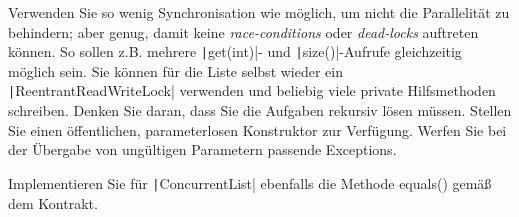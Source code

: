 \documentclass[11pt]{article} %
\newcommand{\code}[1]{\texttt|#1|}
\begin{document}
Verwenden Sie so wenig Synchronisation wie möglich, um nicht die Parallelität zu behindern; aber genug, damit keine \emph{race-conditions} oder \emph{dead-locks} auftreten können. So sollen z.B. mehrere \code{get(int)}- und \code{size()}-Aufrufe gleichzeitig möglich sein. Sie können für die Liste selbst wieder ein \code{ReentrantReadWriteLock} verwenden und beliebig viele private Hilfsmethoden schreiben. Denken Sie daran, dass Sie die Aufgaben rekursiv lösen müssen. Stellen Sie einen öffentlichen, parameterlosen Konstruktor zur Verfügung. Werfen Sie bei der Übergabe von ungültigen Parametern passende Exceptions.\par
Implementieren Sie für \code{ConcurrentList} ebenfalls die Methode equals() gemäß dem Kontrakt.

\printbibliography
\end{document}
